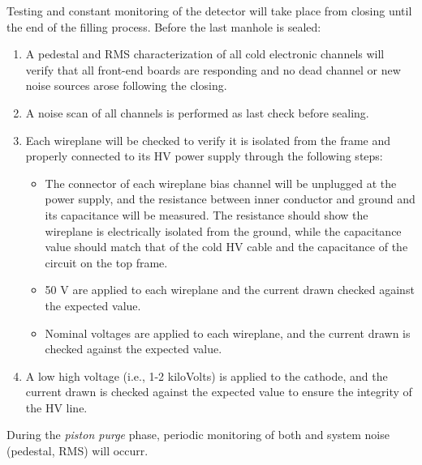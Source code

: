 Testing and constant monitoring of the detector will take place from  closing until the end of the filling process.
Before the last manhole is sealed:
\begin{enumerate}

    \item A pedestal and RMS  characterization of all cold electronic channels will verify that all  front-end boards are responding and no dead channel or new noise sources arose following the  closing.
    
    \item A noise scan of all  channels is performed as last check before sealing.

    \item Each  wireplane will be checked to verify it is isolated from the  frame and properly connected to its HV power supply through the following steps:
    
\begin{itemize}

    \item The  connector of each wireplane bias channel will be unplugged at the power supply, and the resistance between inner conductor and ground and its capacitance will be measured. The resistance should show the wireplane is electrically isolated from the ground, while the capacitance value should match that of the cold HV cable and the capacitance of the circuit on the  top frame.

    \item 50 V are applied to each wireplane and the current drawn checked against the expected value.
    
    \item Nominal voltages are applied to each wireplane, and the current drawn is checked against the expected value. 
    
\end{itemize}

    \item A low high voltage (i.e., 1-2 kiloVolts) is applied to the cathode, and the current drawn is checked against the expected value to ensure the integrity of the HV line.

\end{enumerate}

During the \textit{piston purge} phase, periodic monitoring of both   and  system noise (pedestal, RMS) will occurr.

